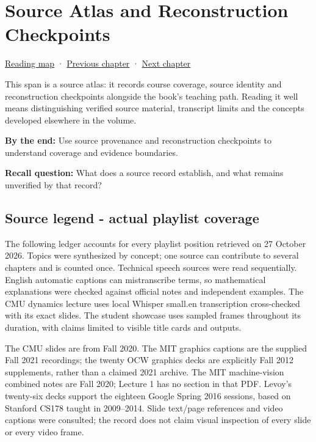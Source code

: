 \chapter{Source Atlas and Reconstruction Checkpoints}\label{04-visual-computing-ii-ch036-source-atlas-and-reconstruction-checkpoints}\hypertarget{04-visual-computing-ii-ch036}{}\label{stagechapter:04-visual-computing-ii-ch036}

\hypertarget{04-visual-computing-ii-ch036-source-atlas-and-reconstruction-checkpoints}{}

\hyperref[volume-reading-map]{Reading map} · \hyperref[04-visual-computing-ii-ch034]{Previous chapter} · \hyperref[04-visual-computing-ii-ch037-gaussian-splatting-and-editable-captured-worlds]{Next chapter}

This span is a source atlas: it records course coverage, source identity and reconstruction checkpoints alongside the book's teaching path. Reading it well means distinguishing verified source material, transcript limits and the concepts developed elsewhere in the volume.

\textbf{By the end:} Use source provenance and reconstruction checkpoints to understand coverage and evidence boundaries.

\textbf{Recall question:} What does a source record establish, and what remains unverified by that record?

\section{Source legend - actual playlist coverage}\label{04-visual-computing-ii-ch036-source-legend---actual-playlist-coverage}

\hypertarget{04-visual-computing-ii-ch036-source-legend---actual-playlist-coverage}{}

The following ledger accounts for every playlist position retrieved on 27 October 2026. Topics were synthesized by concept; one source can contribute to several chapters and is counted once. Technical speech sources were read sequentially. English automatic captions can mistranscribe terms, so mathematical explanations were checked against official notes and independent examples. The CMU dynamics lecture uses local Whisper small.en transcription cross-checked with its exact slides. The student showcase uses sampled frames throughout its duration, with claims limited to visible title cards and outputs.

The CMU slides are from Fall 2020. The MIT graphics captions are the supplied Fall 2021 recordings; the twenty OCW graphics decks are explicitly Fall 2012 supplements, rather than a claimed 2021 archive. The MIT machine-vision combined notes are Fall 2020; Lecture 1 has no section in that PDF. Levoy's twenty-six decks support the eighteen Google Spring 2016 sessions, based on Stanford CS178 taught in 2009--2014. Slide text/page references and video captions were consulted; the record does not claim visual inspection of every slide or every video frame.

